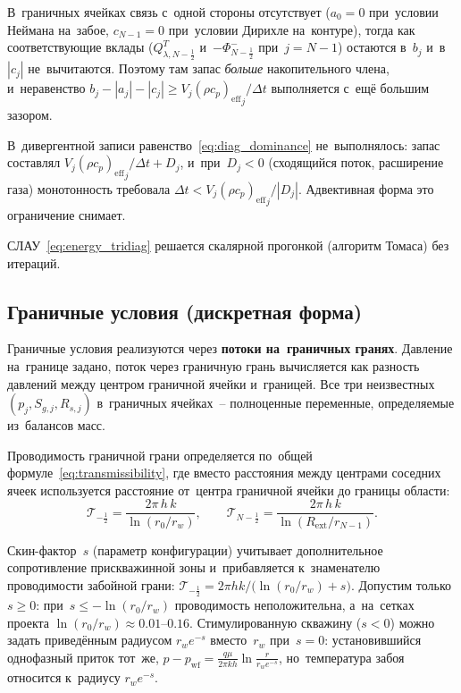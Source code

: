 \documentclass[12pt,a4paper]{article}
\newcommand{\half}{\tfrac{1}{2}}
\newcommand{\rw}{r_w}
\newcommand{\Rext}{R_{\mathrm{ext}}}
\newcommand{\pwf}{p_{\mathrm{wf}}}
\newcommand{\rhocpeff}{(\rho c_p)_{\mathrm{eff}}}
\begin{document}
В~граничных ячейках связь с~одной стороны отсутствует
($a_0 = 0$ при~условии Неймана на~забое, $c_{N-1} = 0$ при~условии
Дирихле на~контуре), тогда как соответствующие вклады
($Q_{\lambda,N-\half}^T$ и~$-\Phi_{N-\half}^{-}$ при~$j = N{-}1$) остаются
в~$b_j$ и~в~$|c_j|$ не~вычитаются. Поэтому там запас
\emph{больше} накопительного члена, и~неравенство
$b_j - |a_j| - |c_j| \geqslant V_j{\rhocpeff}_j/\Delta t$
выполняется с~ещё большим зазором.

В~дивергентной записи равенство~\eqref{eq:diag_dominance}
не~выполнялось: запас составлял
$V_j{\rhocpeff}_j/\Delta t + D_j$, и~при~$D_j < 0$ (сходящийся поток,
расширение газа) монотонность требовала
$\Delta t < V_j{\rhocpeff}_j/|D_j|$. Адвективная форма это
ограничение снимает.

СЛАУ~\eqref{eq:energy_tridiag} решается скалярной прогонкой
(алгоритм Томаса) без итераций.


\subsection{Граничные условия (дискретная форма)}\label{ssec:bc_disc}

Граничные условия реализуются через \textbf{потоки
на~граничных гранях}. Давление на~границе задано, поток
через граничную грань вычисляется как разность давлений
между центром граничной ячейки и~границей. Все три
неизвестных $(p_j, S_{g,j}, R_{s,j})$ в~граничных ячейках~--
полноценные переменные, определяемые из~балансов масс.

Проводимость граничной грани определяется по~общей
формуле~\eqref{eq:transmissibility}, где вместо расстояния
между центрами соседних ячеек используется расстояние от~центра
граничной ячейки до границы области:
\[
  \mathcal{T}_{-\half} = \frac{2\pi\,h\,k}{\ln(r_0/\rw)},
  \qquad
  \mathcal{T}_{N-\half} = \frac{2\pi\,h\,k}{\ln(\Rext/r_{N-1})}.
\]

Скин-фактор~$s$ (параметр конфигурации) учитывает дополнительное
сопротивление прискважинной зоны и~прибавляется к~знаменателю
проводимости забойной грани:
$\mathcal{T}_{-\half} = 2\pi h k / \bigl(\ln(r_0/\rw) + s\bigr)$.
Допустим только $s \ge 0$: при~$s \le -\ln(r_0/\rw)$ проводимость
неположительна, а~на~сетках проекта $\ln(r_0/\rw) \approx 0.01$--$0.16$.
Стимулированную скважину ($s < 0$) можно задать приведённым радиусом
$\rw e^{-s}$ вместо~$\rw$ при~$s = 0$: установившийся однофазный приток
тот~же, $p - \pwf = \frac{q\mu}{2\pi k h}\ln\frac{r}{\rw e^{-s}}$, но~температура
забоя относится к~радиусу $\rw e^{-s}$.
\end{document}
